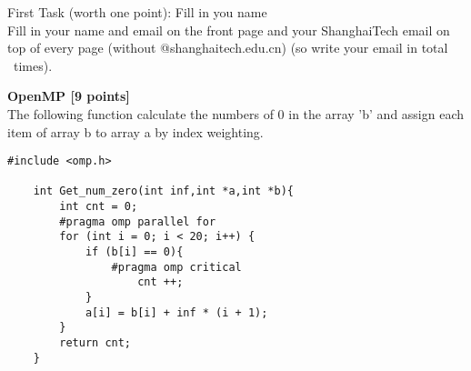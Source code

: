 \documentclass[addpoints, 12pt]{exam}
\begin{document}
\begin{questions}

\question[1] First Task (worth one point): Fill in you name\\
Fill in your name and email on the front page and your ShanghaiTech email on top of every page (without @shanghaitech.edu.cn) (so write your email in total \numpages ~times).


\newpage
\question \textbf{OpenMP [9 points]}\\
The following function calculate the numbers of 0 in the array 'b' and 
assign each item of array b to array a by index weighting.

\begin{lstlisting}[style = S]
    #include <omp.h>

    int Get_num_zero(int inf,int *a,int *b){
        int cnt = 0;
        #pragma omp parallel for
        for (int i = 0; i < 20; i++) {
            if (b[i] == 0){
                #pragma omp critical
                    cnt ++;
            }
            a[i] = b[i] + inf * (i + 1);
        }
        return cnt;
    }
\end{lstlisting}

\end{questions}
\end{document}

